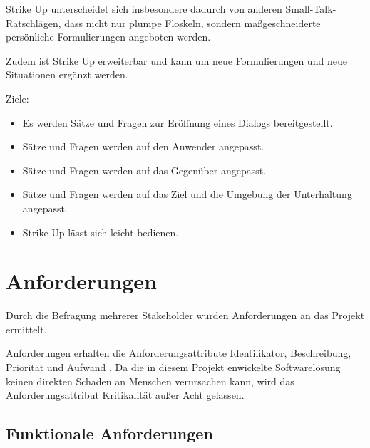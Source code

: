 Strike Up unterscheidet sich insbesondere dadurch von anderen Small-Talk-Ratschlägen, dass nicht nur plumpe Floskeln, sondern maßgeschneiderte persönliche Formulierungen angeboten werden.

Zudem ist Strike Up erweiterbar und kann um neue Formulierungen und neue Situationen ergänzt werden.
\par
\endgroup
Ziele: \newline
\begin{itemize}
    \item Es werden Sätze und Fragen zur Eröffnung eines Dialogs bereitgestellt.
    \item Sätze und Fragen werden auf den Anwender angepasst.
    \item Sätze und Fragen werden auf das Gegenüber angepasst.
    \item Sätze und Fragen werden auf das Ziel und die Umgebung der Unterhaltung angepasst.
    \item Strike Up lässt sich leicht bedienen.
\end{itemize}


\section{Anforderungen}
\label{sec:anforderungen}

Durch die Befragung mehrerer Stakeholder wurden Anforderungen an das Projekt ermittelt.

Anforderungen erhalten die Anforderungsattribute Identifikator, Beschreibung, Priorität und Aufwand \cite[S.~479~f.]{Balzert:Lehrbuch-der-softwaretechnik}. Da die in diesem Projekt enwickelte Softwarelösung keinen direkten Schaden an Menschen verursachen kann, wird das Anforderungsattribut \glqq{}Kritikalität\grqq{} außer Acht gelassen.

\subsection{Funktionale Anforderungen}
\label{subsec:funktional}

